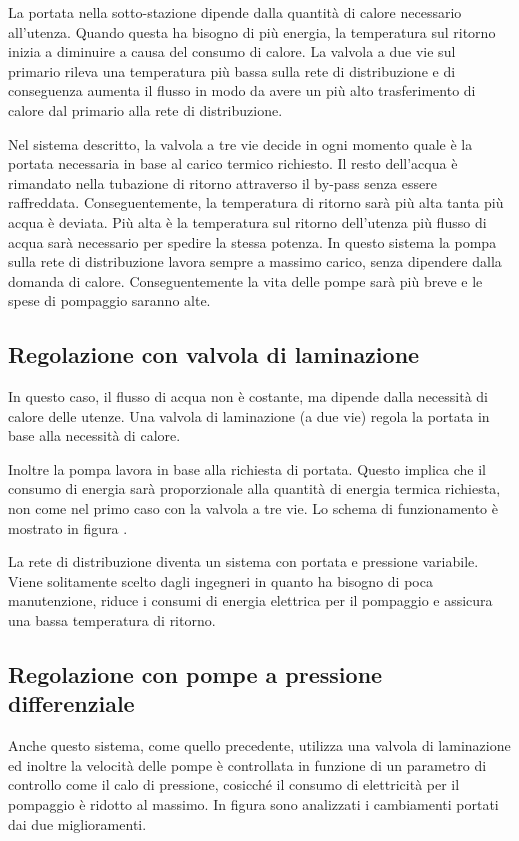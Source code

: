 \documentclass[laurea,oneside,11pt]{USiena_tesiLM}
\begin{document}

La portata nella sotto-stazione dipende dalla quantità di calore necessario all'utenza. Quando questa ha bisogno di più energia, la temperatura sul ritorno inizia a diminuire a causa del consumo di calore. La valvola a due vie sul primario  rileva una temperatura più bassa sulla rete di distribuzione e di conseguenza aumenta il flusso in modo da avere un più alto trasferimento di calore dal primario alla rete di distribuzione.

Nel sistema descritto, la valvola a tre vie decide in ogni momento quale è la portata necessaria in base al carico termico richiesto. Il resto dell'acqua è rimandato nella tubazione di ritorno attraverso il by-pass senza essere raffreddata. Conseguentemente, la temperatura di ritorno sarà più alta tanta più acqua è deviata. Più alta è la temperatura sul ritorno dell'utenza     più flusso di acqua sarà necessario per spedire la stessa potenza. In questo sistema la pompa sulla rete di distribuzione lavora sempre a massimo carico, senza dipendere dalla domanda di calore. Conseguentemente la vita delle pompe sarà più breve e le spese di pompaggio saranno alte.

\subsection{Regolazione con valvola di laminazione}
In questo caso, il flusso di acqua non è costante, ma dipende dalla necessità di calore delle utenze. Una valvola di laminazione (a due vie) regola la portata in base alla necessità di calore. 

Inoltre la pompa lavora in base alla richiesta di portata. Questo implica che il consumo di energia sarà proporzionale alla quantità di energia termica richiesta, non come nel primo caso con la valvola a tre vie. Lo schema di funzionamento è mostrato in figura .


La rete di distribuzione diventa un sistema con portata e pressione variabile. Viene solitamente scelto dagli ingegneri in quanto ha bisogno di poca manutenzione, riduce i consumi di energia elettrica per il pompaggio e assicura una bassa temperatura di ritorno.

\subsection{Regolazione con pompe a pressione differenziale}
Anche questo sistema, come quello precedente, utilizza una valvola di laminazione ed inoltre la velocità delle pompe è controllata in funzione di un parametro di controllo come il calo di pressione, cosicché il consumo di elettricità per il pompaggio è ridotto al massimo. In figura sono analizzati i cambiamenti portati dai due miglioramenti.
\end{document}
